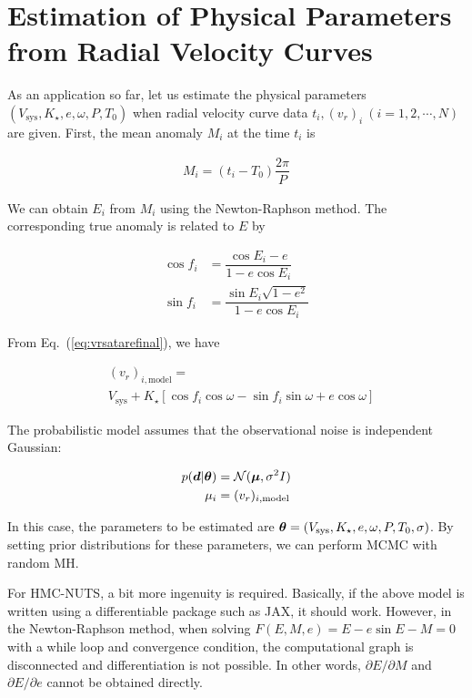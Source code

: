 \section{Estimation of Physical Parameters from Radial Velocity Curves}

As an application so far, let us estimate the physical parameters 
$(V_\mathrm{sys}, K_\star, e, \omega, P, T_0)$ when radial velocity curve data 
${t_i, (v_r)_i} \ (i=1,2,\cdots,N)$ are given.  
First, the mean anomaly $M_i$ at the time $t_i$ is

\begin{align}
    M_i = (t_i - T_0) \dfrac{2 \pi}{P}
\end{align}

We can obtain $E_i$ from $M_i$ using the Newton-Raphson method.  
The corresponding true anomaly is related to $E$ by

\begin{align}
    \cos{f_i} &= \dfrac{\cos{E_i}-e}{1 - e \cos{E_i}} \\
    \sin{f_i} &= \dfrac{\sin{E_i} \sqrt{1-e^2}}{1 - e \cos{E_i}} 
\end{align}

From Eq.~(\ref{eq:vrsatarefinal}), we have

\begin{align}
&(v_r)_{i, \mathrm{model}} = \nonumber \\
&V_\mathrm{sys} + K_\star \left[ \cos{f_i} \cos{\omega} - \sin{f_i} \sin{\omega} + e \cos{\omega} \right] 
\end{align}

The probabilistic model assumes that the observational noise is independent Gaussian:

\begin{align}
    p(\boldsymbol{d}|\boldsymbol{\theta}) &= \mathcal{N}(\boldsymbol{\mu}, \sigma^2 I) \\
    \mu_i &= (v_r)_{i, \mathrm{model}} 
\end{align}

In this case, the parameters to be estimated are 
$\boldsymbol{\theta} = (V_\mathrm{sys}, K_\star, e, \omega, P, T_0, \sigma)$.  
By setting prior distributions for these parameters, we can perform MCMC with random MH.

For HMC-NUTS, a bit more ingenuity is required.  
Basically, if the above model is written using a differentiable package such as JAX, it should work.  
However, in the Newton-Raphson method, when solving 
$F(E,M,e) = E - e \sin{E} - M = 0$ with a while loop and convergence condition, the computational graph is disconnected and differentiation is not possible.  
In other words, $\partial E/\partial M$ and $\partial E/\partial e$ cannot be obtained directly.  

